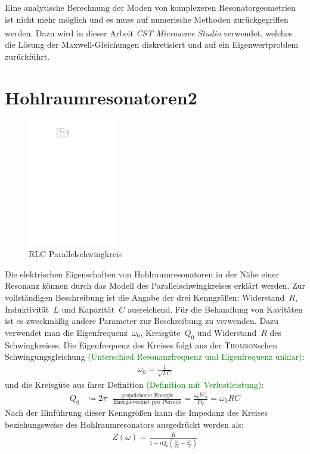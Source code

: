 \documentclass[11pt, a4paper]{scrbook}
\newcommand{\todo}[1]{{\textcolor{Green}{(#1)}}}
\begin{document}
	Eine analytische Berechnung der Moden von komplexeren Resonatorgeometrien ist nicht mehr möglich und es muss auf numerische Methoden zurückgegriffen werden.
	Dazu wird in dieser Arbeit \emph{CST Microwave Studio\textsuperscript{\textregistered}} verwendet, welches die Lösung der Maxwell-Gleichungen diskretisiert und auf ein Eigenwertproblem zurückführt.
	
	\section{Hohlraumresonatoren2}
	\begin{figure}[h]
		\centering
		\includegraphics[width=0.35\textwidth]{./figures/RLC_circuit.pdf}
		\caption{RLC Parallelschwingkreis}
		\label{fig:rlc_circuit}
	\end{figure}
	Die elektrischen Eigenschaften von Hohlraumresonatoren in der Nähe einer Resonanz können durch das Modell des Parallelschwingkreises erklärt werden.
	Zur vollständigen Beschreibung ist die Angabe der drei Kenngrößen: Widerstand~$R$, Induktivität~$L$ und Kapazität~$C$ ausreichend.
	Für die Behandlung von Kavitäten ist es zweckmäßig andere Parameter zur Beschreibung zu verwenden.
	Dazu verwendet man die Eigenfrequenz~$\omega_0$, Kreisgüte~$Q_0$ und Widerstand~$R$ des Schwingkreises.
	Die Eigenfrequenz des Kreises folgt aus der \textsc{Thomson}schen Schwingungsgleichung \todo{Unterschied Resonanzfrequenz und Eigenfrequenz unklar}:
	\begin{align}
		\omega_0 = \frac{1}{\sqrt{L C}}
	\end{align}
	und die Kreisgüte aus ihrer Definition \todo{Definition mit Verlustleistung}:
	\begin{align}
		Q_0 &\coloneqq 2\pi \cdot \frac{\text{gespeicherte Energie}}{\text{Energieverlust pro Periode}} = \frac{\omega_0 W_0}{P_\mathrm{V}} = \omega_0 R C
		\label{eq:def_guete}
	\end{align}
	Nach der Einführung dieser Kenngrößen kann die Impedanz des Kreises beziehungsweise des Hohlraumresonators ausgedrückt werden als:
	\begin{align}
		Z(\omega) = \frac{R}{1 + i Q_0 \left( \frac{\omega}{\omega_0}  - \frac{\omega_0}{\omega}\right)}
	\end{align}
	
\end{document}
